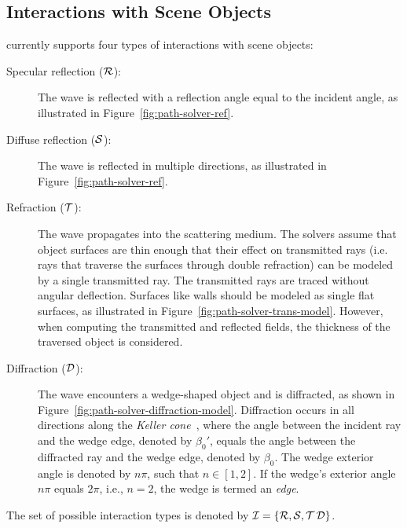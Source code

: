 \subsection{Interactions with Scene Objects}

\SRT{} currently supports four types of interactions with scene objects:
\begin{description}
    \item[Specular reflection (${\cal R}$):] The wave is reflected with a reflection angle equal to the incident angle, as illustrated in Figure~\ref{fig:path-solver-ref}.
    \item[Diffuse reflection (${\cal S}$):] The wave is reflected in multiple directions, as illustrated in Figure~\ref{fig:path-solver-ref}.
    \item[Refraction (${\cal T}$):] The wave propagates into the scattering medium. The solvers assume that object surfaces are thin enough that their effect on transmitted rays (i.e. rays that traverse the surfaces through double refraction) can be modeled by a single transmitted ray. The transmitted rays are traced without angular deflection. Surfaces like walls should be modeled as single flat surfaces, as illustrated in Figure~\ref{fig:path-solver-trans-model}.
    However, when computing the transmitted and reflected fields, the thickness of the traversed object is considered.
    \item[Diffraction (${\cal D}$):] The wave encounters a wedge-shaped object and is diffracted, as shown in Figure~\ref{fig:path-solver-diffraction-model}. Diffraction occurs in all directions along the \emph{Keller cone}~\cite{Keller:62}, where the angle between the incident ray and the wedge edge, denoted by $\beta_0'$, equals the angle between the diffracted ray and the wedge edge, denoted by $\beta_0$. The wedge exterior angle is denoted by $n\pi$, such that $n \in [1, 2]$. If the wedge's exterior angle $n\pi$ equals $2\pi$, i.e., $n = 2$, the wedge is termed an \emph{edge}.
\end{description}
The set of possible interaction types is denoted by ${\cal I} = \{{\cal R}, {\cal S}, {\cal T}\, {\cal D}\}$.

